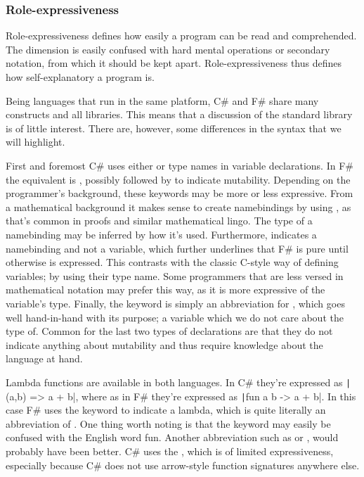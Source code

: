 \subsubsection{Role-expressiveness}
Role-expressiveness defines how easily a program can be read and comprehended. The dimension is easily confused with hard mental operations or secondary notation, from which it should be kept apart\cite{green1996usability}. Role-expressiveness thus defines how self-explanatory a program is.

Being languages that run in the same platform, C\# and F\# share many constructs and all libraries. This means that a discussion of the standard library is of little interest. There are, however, some differences in the syntax that we will highlight. 

First and foremost C\# uses either  or type names in variable declarations. In F\# the equivalent is , possibly followed by  to indicate mutability. Depending on the programmer's background, these keywords may be more or less expressive. From a mathematical background it makes sense to create namebindings by using , as that's common in proofs and similar mathematical lingo. The type of a namebinding may be inferred by how it's used. Furthermore,  indicates a namebinding and not a variable, which further underlines that F\# is pure until otherwise is expressed. This contrasts with the classic C-style way of defining variables; by using their type name. Some programmers that are less versed in mathematical notation may prefer this way, as it is more expressive of the variable's type. Finally, the  keyword is simply an abbreviation for , which goes well hand-in-hand with its purpose; a variable which we do not care about the type of. Common for the last two types of declarations are that they do not indicate anything about mutability and thus require knowledge about the language at hand.

Lambda functions are available in both languages. In C\# they're expressed as \texttt|(a,b) => a + b|, where as in F\# they're expressed as \texttt|fun a b -> a + b|. In this case F\# uses the keyword  to indicate a lambda, which is quite literally an abbreviation of . One thing worth noting is that the  keyword may easily be confused with the English word fun. Another abbreviation such as  or , would probably have been better. C\# uses the \ttt{=\textgreater}, which is of limited expressiveness, especially because C\# does not use arrow-style function signatures anywhere else.

